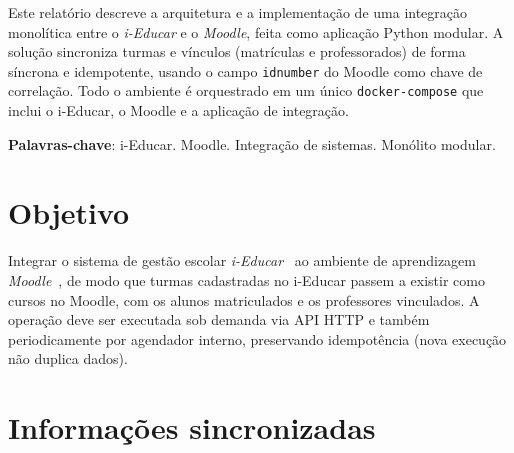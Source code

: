 \documentclass[
	12pt,
	oneside,
	a4paper,
	chapter=TITLE,
	section=TITLE,
	sumario=tradicional,
	english,
	brazil
]{abntex2}
\begin{document}
\frenchspacing

\imprimircapa
\imprimirfolhaderosto*

\setlength{\absparsep}{18pt}
\begin{resumo}
Este relatório descreve a arquitetura e a implementação de uma integração monolítica entre o
\emph{i-Educar} e o \emph{Moodle}, feita como aplicação Python modular. A solução
sincroniza turmas e vínculos (matrículas e professorados) de forma síncrona e idempotente,
usando o campo \texttt{idnumber} do Moodle como chave de correlação. Todo o ambiente é
orquestrado em um único \texttt{docker-compose} que inclui o i-Educar, o Moodle e a
aplicação de integração.

\textbf{Palavras-chave}: i-Educar. Moodle. Integração de sistemas. Monólito modular.
\end{resumo}

\listoffigures*
\cleardoublepage

\listoftables*
\cleardoublepage

\tableofcontents*
\cleardoublepage

\textual

\chapter{Objetivo}

Integrar o sistema de gestão escolar \emph{i-Educar}~\cite{ieducar} ao ambiente de
aprendizagem \emph{Moodle}~\cite{moodle-ws}, de modo que turmas cadastradas no i-Educar passem a existir como cursos no
Moodle, com os alunos matriculados e os professores vinculados. A operação deve ser
executada sob demanda via API HTTP e também periodicamente por agendador interno,
preservando idempotência (nova execução não duplica dados).

\chapter{Informações sincronizadas}
\end{document}
